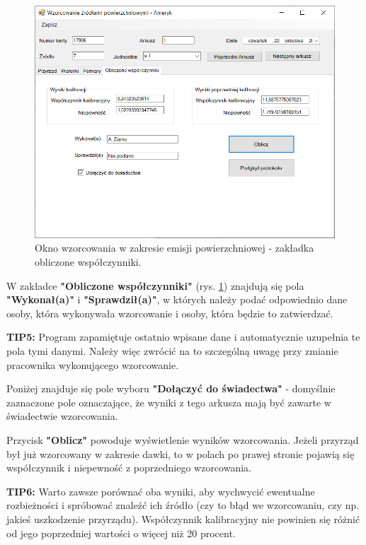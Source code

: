 {{{	\begin{figure}[htb]
		\centering
		\includegraphics[width=\columnwidth]{obrazki/Wzorcowanie/emisja/wspolczynniki.png}
		\caption{Okno wzorcowania w zakresie emisji powierzchniowej - zakładka obliczone współczynniki.}
		\label{emisjaWspolczynniki}
	\end{figure}
	
	W zakładce \textbf{"Obliczone współczynniki"} (rys. \ref{emisjaWspolczynniki}) znajdują się pola \textbf{"Wykonał(a)"} i \textbf{"Sprawdził(a)"}, w których należy podać odpowiednio dane osoby, która wykonywała wzorcowanie i osoby, która będzie to zatwierdzać. 
	
	\textbf{TIP5:} Program zapamiętuje ostatnio wpisane dane i automatycznie uzupełnia te pola tymi danymi. Należy więc zwrócić na to szczególną uwagę przy zmianie pracownika wykonującego wzorcowanie.
	
	Poniżej znajduje się pole wyboru \textbf{"Dołączyć do świadectwa"} - domyślnie zaznaczone pole oznaczające, że wyniki z tego arkusza mają być zawarte w świadectwie wzorcowania.
	
	Przycisk \textbf{"Oblicz"} powoduje wyświetlenie wyników wzorcowania. Jeżeli przyrząd był już wzorcowany w zakresie dawki, to w polach po prawej stronie pojawią się współczynnik i niepewność z poprzedniego wzorcowania. 
	
	\textbf{TIP6:} Warto zawsze porównać oba wyniki, aby wychwycić ewentualne rozbieżności i spróbować znaleźć ich źródło (czy to błąd we wzorcowaniu, czy np. jakieś uszkodzenie przyrządu). Współczynnik kalibracyjny nie powinien się różnić od jego poprzedniej wartości o więcej niż 20 procent.

}}}
